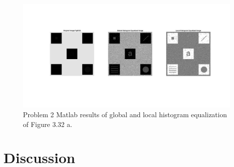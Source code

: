 \documentclass[./rarnold_report2.tex]{subfiles}
\begin{document}
	\begin{figure}[!htbp]
	\centering
	\includegraphics[scale=0.28]{"local_histeq"}
	\caption{Problem 2 Matlab results of global and local histogram equalization of Figure 3.32 a.} 
	\label{local}
	\end{figure}

\section*{Discussion}
\end{document}
